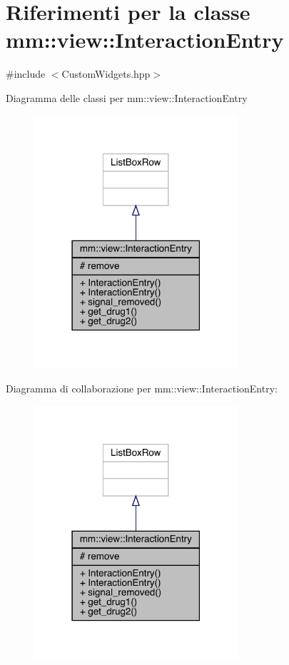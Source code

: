 \hypertarget{classmm_1_1view_1_1_interaction_entry}{}\section{Riferimenti per la classe mm\+:\+:view\+:\+:Interaction\+Entry}
\label{classmm_1_1view_1_1_interaction_entry}


{\ttfamily \#include $<$Custom\+Widgets.\+hpp$>$}



Diagramma delle classi per mm\+:\+:view\+:\+:Interaction\+Entry
\nopagebreak
\begin{figure}[H]
\begin{center}
\leavevmode
\includegraphics[width=214pt]{d9/dda/classmm_1_1view_1_1_interaction_entry__inherit__graph}
\end{center}
\end{figure}


Diagramma di collaborazione per mm\+:\+:view\+:\+:Interaction\+Entry\+:
\nopagebreak
\begin{figure}[H]
\begin{center}
\leavevmode
\includegraphics[width=214pt]{d0/d1d/classmm_1_1view_1_1_interaction_entry__coll__graph}
\end{center}
\end{figure}
